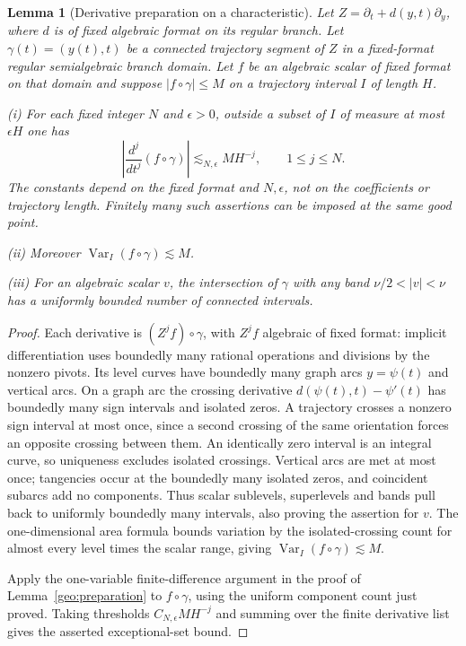 \documentclass[11pt]{amsart}
\newtheorem{lemma}[theorem]{Lemma}
\theoremstyle{definition}
\theoremstyle{remark}
\numberwithin{equation}{section}
\begin{document}
\begin{lemma}[Derivative preparation on a characteristic]\label{geo:characteristic-preparation}
Let $Z=\partial_t+d(y,t)\partial_y$, where $d$ is of fixed algebraic format on its regular branch. Let $\gamma(t)=(y(t),t)$ be a connected trajectory segment of $Z$ in a fixed-format regular semialgebraic branch domain. Let $f$ be an algebraic scalar of fixed format on that domain and suppose $|f\circ\gamma|\le M$ on a trajectory interval $I$ of length $H$.

\noindent\textup{(i)} For each fixed integer $N$ and $\epsilon>0$, outside a subset of $I$ of measure at most $\epsilon H$ one has
\[
\left|\frac{d^j}{dt^j}(f\circ\gamma)\right|\lesssim_{N,\epsilon} M H^{-j},\qquad 1\le j\le N.
\]
The constants depend on the fixed format and $N,\epsilon$, not on the coefficients or trajectory length. Finitely many such assertions can be imposed at the same good point.

\noindent\textup{(ii)} Moreover $\operatorname{Var}_I(f\circ\gamma)\lesssim M$.

\noindent\textup{(iii)} For an algebraic scalar $v$, the intersection of $\gamma$ with any band $\nu/2<|v|<\nu$ has a uniformly bounded number of connected intervals.
\end{lemma}
\begin{proof}
Each derivative is $(Z^jf)\circ\gamma$, with $Z^jf$ algebraic of fixed format: implicit differentiation uses boundedly many rational operations and divisions by the nonzero pivots. Its level curves have boundedly many graph arcs $y=\psi(t)$ and vertical arcs. On a graph arc the crossing derivative $d(\psi(t),t)-\psi'(t)$ has boundedly many sign intervals and isolated zeros. A trajectory crosses a nonzero sign interval at most once, since a second crossing of the same orientation forces an opposite crossing between them. An identically zero interval is an integral curve, so uniqueness excludes isolated crossings. Vertical arcs are met at most once; tangencies occur at the boundedly many isolated zeros, and coincident subarcs add no components. Thus scalar sublevels, superlevels and bands pull back to uniformly boundedly many intervals, also proving the assertion for $v$. The one-dimensional area formula \cite[Theorems 1--2]{low:area} bounds variation by the isolated-crossing count for almost every level times the scalar range, giving $\operatorname{Var}_I(f\circ\gamma)\lesssim M$.

Apply the one-variable finite-difference argument in the proof of Lemma~\ref{geo:preparation} to $f\circ\gamma$, using the uniform component count just proved. Taking thresholds $C_{N,\epsilon}MH^{-j}$ and summing over the finite derivative list gives the asserted exceptional-set bound.
\end{proof}
\end{document}
